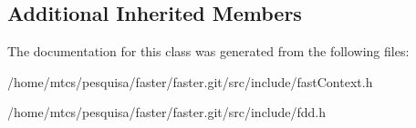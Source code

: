\subsection*{Additional Inherited Members}


The documentation for this class was generated from the following files\+:\begin{DoxyCompactItemize}
\item 
/home/mtcs/pesquisa/faster/faster.\+git/src/include/fast\+Context.\+h\item 
/home/mtcs/pesquisa/faster/faster.\+git/src/include/fdd.\+h\end{DoxyCompactItemize}
